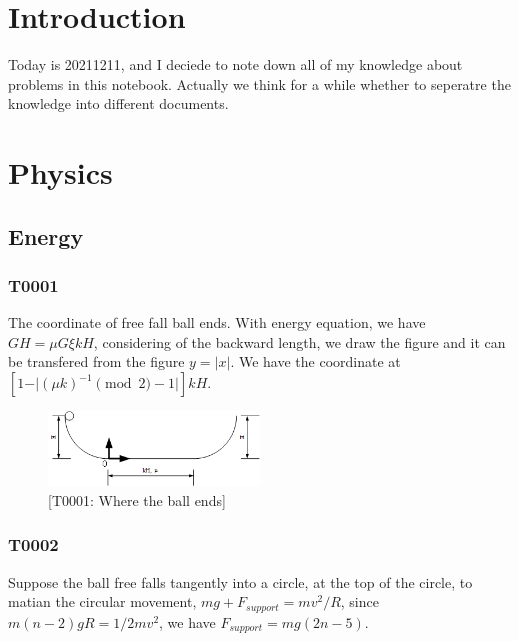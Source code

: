 \documentclass[UTF8]{article}
\begin{document}
\section{Introduction}
Today is 20211211, and I deciede to note down all of my knowledge about problems in this notebook. Actually we think for a while whether to seperatre the knowledge into different documents.

\section{Physics}

\subsection{Energy}

\subsubsection{T0001}
The coordinate of free fall ball ends. With energy equation, we have $GH = \mu G \xi kH$, considering of the backward length, we draw the figure and it can be transfered from the figure $y = |x|$. We have the coordinate
at $[1-\vert (\mu k)^{-1} \pmod 2 -1 \vert ]kH $.
\begin{figure}[h]
    \centering
    \includegraphics[width=0.5\textwidth]{../../resources/T0001.png}
    \caption{[T0001: Where the ball ends]}
    \label{fig:1}
\end{figure}

\subsubsection{T0002}
Suppose the ball free falls tangently into a circle, at the top of the circle, to matian the circular movement, $mg + F_{support} = mv^2/R$, since $m(n-2)gR = 1/2mv^2$, we have $F_{support} = mg(2n-5)$.
\end{document}
